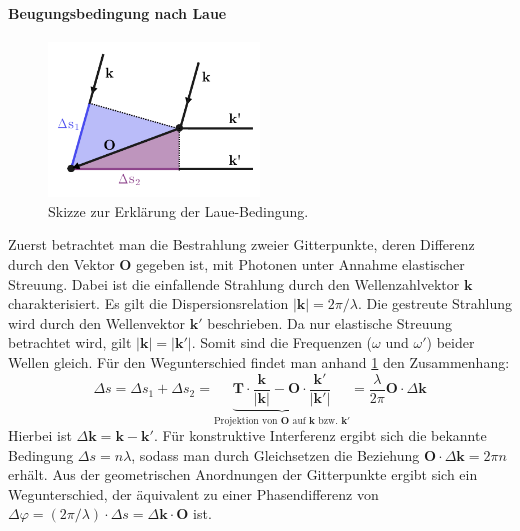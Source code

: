 \paragraph{Beugungsbedingung nach Laue}
\begin{figure}
    \centering
    \includegraphics[width=0.5\textwidth]{../assets/theorie/lauebeugung}
    \caption{Skizze zur Erklärung der Laue-Bedingung. } \label{fig:laue}
\end{figure}
Zuerst betrachtet man die Bestrahlung zweier Gitterpunkte, deren Differenz durch den Vektor $\mathbf{O}$ gegeben ist,
mit Photonen unter Annahme elastischer Streuung.
Dabei ist die einfallende Strahlung durch den Wellenzahlvektor  $\mathbf{k}$ charakterisiert.
Es gilt die Dispersionsrelation $\lvert \mathbf{k} \rvert = 2 \pi / \lambda$.
Die gestreute Strahlung wird durch den Wellenvektor $\mathbf{k}'$ beschrieben.
Da nur elastische Streuung betrachtet wird, gilt $\lvert \mathbf{k} \rvert=\lvert \mathbf{k}' \rvert$.
Somit sind die Frequenzen ($\omega$ und $\omega'$) beider Wellen gleich.
Für den Wegunterschied findet man anhand \cref{fig:laue} den Zusammenhang:
\begin{equation*}
    \Delta s = \Delta s_{1} + \Delta s_{2} = \underbrace{ \mathbf{T} \cdot \frac{\mathbf{k}}{\lvert \mathbf{k} \rvert }
    -\mathbf{O}\cdot \frac{\mathbf{k}'}{\lvert \mathbf{k}' \rvert}  }_{ \text{Projektion von } \mathbf{O} \text{ auf }
    \mathbf{k} \text{ bzw. }\mathbf{k'} } =  \frac{\lambda}{2\pi} \mathbf{O}\cdot\Delta \mathbf{k}
\end{equation*}
Hierbei ist $\Delta \mathbf{k} = \mathbf{k}-\mathbf{k}'$.
Für konstruktive Interferenz ergibt sich die bekannte Bedingung $\Delta s = n \lambda$, sodass man durch Gleichsetzen
die Beziehung $\mathbf{O}\cdot\Delta \mathbf{k} =2\pi n$ erhält.
Aus der geometrischen Anordnungen der Gitterpunkte ergibt sich ein Wegunterschied, der äquivalent
zu einer Phasendifferenz von $\Delta\varphi=(2\pi / \lambda) \cdot \Delta s = \Delta \mathbf{k}\cdot \mathbf{O}$ ist.
\autocite[122-123]{Ashcroft}

